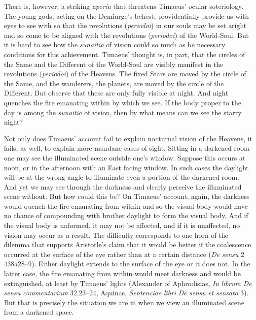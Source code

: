 There is, however, a striking \emph{aporia} that threatens Timaeus' ocular soteriology. The young gods, acting on the Demiurge's behest, providentially provide us with eyes to see with so that the revolutions (\emph{periodoi}) in our souls may be set aright and so come to be aligned with the revolutions (\emph{periodoi}) of the World-Soul. But it is hard to see how the \emph{sunaitia} of vision could so much as be necessary conditions for this achievement. Timaeus' thought is, in part, that the circles of the Same and the Different of the World-Soul are visibly manifest in the revolutions (\emph{periodoi}) of the Heavens. The fixed Stars are moved by the circle of the Same, and the wanderers, the planets, are moved by the circle of the Different. But observe that these are only fully visible at night. And night quenches the fire emanating within by which we see. If the body proper to the day is among the \emph{sunaitia} of vision, then by what means can we see the starry night?

Not only does Timaeus' account fail to explain nocturnal vision of the Heavens, it fails, as well, to explain more mundane cases of sight. Sitting in a darkened room one may see the illuminated scene outside one's window. Suppose this occurs at noon, or in the afternoon with an East facing window. In such cases the daylight will be at the wrong angle to illuminate even a portion of the darkened room. And yet we may see through the darkness and clearly perceive the illuminated scene without. But how could this be? On Timaeus' account, again, the darkness would quench the fire emanating from within and so the visual body would have no chance of compounding with brother daylight to form the visual body. And if the visual body is unformed, it may not be affected, and if it is unaffected, no vision may occur as a result. The difficulty corresponds to one horn of the dilemma that supports Aristotle's claim that it would be better if the coalescence occurred at the surface of the eye rather than at a certain distance (\emph{De sensu} 2 438a28--9). Either daylight extends to the surface of the eye or it does not. In the latter case, the fire emanating from within would meet darkness and would be extinguished, at least by Timaeus' lights (Alexander of Aphrodisias, \emph{In librum De sensu commentarium} 32.23--24, Aquinas, \emph{Sentenciae libri De sensu et sensato} 3). But that is precisely the situation we are in when we view an illuminated scene from a darkened space.

